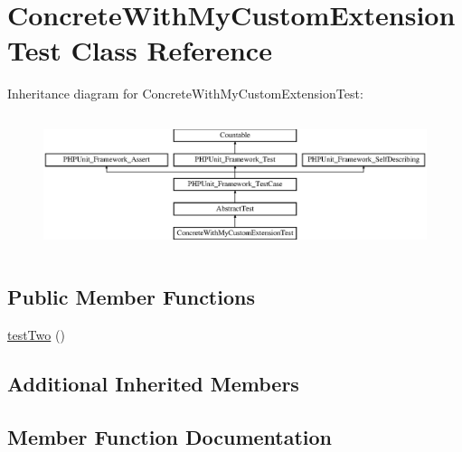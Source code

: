 \hypertarget{class_concrete_with_my_custom_extension_test}{}\section{Concrete\+With\+My\+Custom\+Extension\+Test Class Reference}
\label{class_concrete_with_my_custom_extension_test}
Inheritance diagram for Concrete\+With\+My\+Custom\+Extension\+Test\+:\begin{figure}[H]
\begin{center}
\leavevmode
\includegraphics[height=4.022989cm]{class_concrete_with_my_custom_extension_test}
\end{center}
\end{figure}
\subsection*{Public Member Functions}
\begin{DoxyCompactItemize}
\item 
\mbox{\hyperlink{class_concrete_with_my_custom_extension_test_a4fb9974ce113d5d1db8075e0db0dc9b6}{test\+Two}} ()
\end{DoxyCompactItemize}
\subsection*{Additional Inherited Members}


\subsection{Member Function Documentation}
\mbox{\label{class_concrete_with_my_custom_extension_test_a4fb9974ce113d5d1db8075e0db0dc9b6}} 
